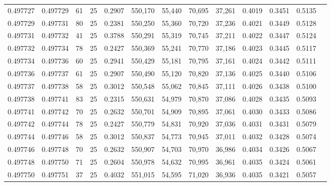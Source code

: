 \begin{tabular}{rrrrrrrrrrrrr}
0.497727 & 0.497729 &    61 &  25 &                                     0.2907 & 550,170 &  55,440 &  70,695 &  37,261 & 0.4019 & 0.3451 & 0.5135 \\
0.497729 & 0.497731 &    80 &  25 &                                     0.2381 & 550,250 &  55,360 &  70,720 &  37,236 & 0.4021 & 0.3449 & 0.5128 \\
0.497731 & 0.497732 &    41 &  25 &                                     0.3788 & 550,291 &  55,319 &  70,745 &  37,211 & 0.4022 & 0.3447 & 0.5124 \\
0.497732 & 0.497734 &    78 &  25 &                                     0.2427 & 550,369 &  55,241 &  70,770 &  37,186 & 0.4023 & 0.3445 & 0.5117 \\
0.497734 & 0.497736 &    60 &  25 &                                     0.2941 & 550,429 &  55,181 &  70,795 &  37,161 & 0.4024 & 0.3442 & 0.5111 \\
0.497736 & 0.497737 &    61 &  25 &                                     0.2907 & 550,490 &  55,120 &  70,820 &  37,136 & 0.4025 & 0.3440 & 0.5106 \\
0.497737 & 0.497738 &    58 &  25 &                                     0.3012 & 550,548 &  55,062 &  70,845 &  37,111 & 0.4026 & 0.3438 & 0.5100 \\
0.497738 & 0.497741 &    83 &  25 &                                     0.2315 & 550,631 &  54,979 &  70,870 &  37,086 & 0.4028 & 0.3435 & 0.5093 \\
0.497741 & 0.497742 &    70 &  25 &                                     0.2632 & 550,701 &  54,909 &  70,895 &  37,061 & 0.4030 & 0.3433 & 0.5086 \\
0.497742 & 0.497744 &    78 &  25 &                                     0.2427 & 550,779 &  54,831 &  70,920 &  37,036 & 0.4031 & 0.3431 & 0.5079 \\
0.497744 & 0.497746 &    58 &  25 &                                     0.3012 & 550,837 &  54,773 &  70,945 &  37,011 & 0.4032 & 0.3428 & 0.5074 \\
0.497746 & 0.497748 &    70 &  25 &                                     0.2632 & 550,907 &  54,703 &  70,970 &  36,986 & 0.4034 & 0.3426 & 0.5067 \\
0.497748 & 0.497750 &    71 &  25 &                                     0.2604 & 550,978 &  54,632 &  70,995 &  36,961 & 0.4035 & 0.3424 & 0.5061 \\
0.497750 & 0.497751 &    37 &  25 &                                     0.4032 & 551,015 &  54,595 &  71,020 &  36,936 & 0.4035 & 0.3421 & 0.5057 \\

\end{tabular}
